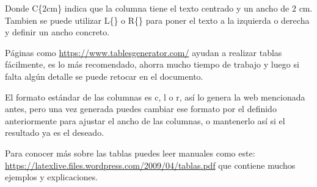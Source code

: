 Donde C\{2cm\} indica que la columna tiene el texto centrado y un ancho de 2 cm. Tambien se puede utilizar L\{\} o R\{\} para poner el texto a la izquierda o derecha y definir un ancho concreto.

Páginas como \url{https://www.tablesgenerator.com/} ayudan a realizar tablas fácilmente, es lo más recomendado, ahorra mucho tiempo de trabajo y luego si falta algún detalle se puede retocar en el documento.

El formato estándar de las columnas es c, l o r, así lo genera la web mencionada antes, pero una vez generada puedes cambiar ese formato por el definido anteriormente para ajustar el ancho de las columnas, o mantenerlo así si el resultado ya es el deseado.

\par Para conocer más sobre las tablas puedes leer manuales como este: \url{https://latexlive.files.wordpress.com/2009/04/tablas.pdf} que contiene muchos ejemplos y explicaciones.

















